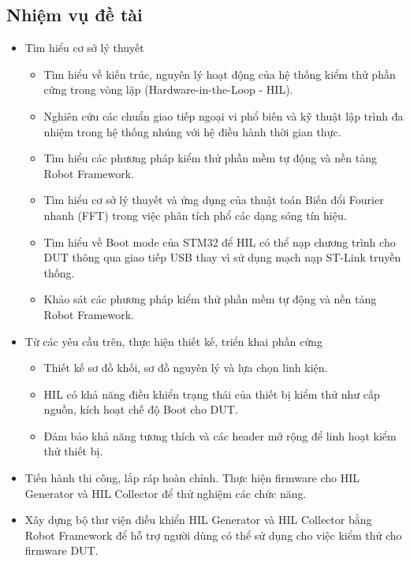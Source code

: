 \subsection{Nhiệm vụ đề tài}
\begin{itemize}
    \item Tìm hiểu cơ sở lý thuyết
    \begin{itemize}
        \item[-] Tìm hiểu về kiến trúc, nguyên lý hoạt động của hệ thống kiểm thử phần cứng trong vòng lặp (Hardware-in-the-Loop - HIL).
        \item[-] Nghiên cứu các chuẩn giao tiếp ngoại vi phổ biến và kỹ thuật lập trình đa nhiệm trong hệ thống nhúng với hệ điều hành thời gian thực.
        \item[-] Tìm hiểu các phương pháp kiểm thử phần mềm tự động và nền tảng Robot Framework.
        \item[-] Tìm hiểu cơ sở lý thuyết và ứng dụng của thuật toán Biến đổi Fourier nhanh (FFT) trong việc phân tích phổ các dạng sóng tín hiệu.
        \item[-] Tìm hiểu về Boot mode của STM32 để HIL có thể nạp chương trình cho DUT thông qua giao tiếp USB thay vì sử dụng mạch nạp ST-Link truyền thống.
        \item[-] Khảo sát các phương pháp kiểm thử phần mềm tự động và nền tảng Robot Framework.
    \end{itemize}

    \item Từ các yêu cầu trên, thực hiện thiết kế, triển khai phần cứng
    \begin{itemize}
        \item[-] Thiết kế sơ đồ khối, sơ đồ nguyên lý và lựa chọn linh kiện.
        \item[-] HIL có khả năng điều khiển trạng thái của thiết bị kiểm thử như cấp nguồn, kích hoạt chế độ Boot cho DUT.
        \item[-] Đảm bảo khả năng tương thích và các header mở rộng để linh hoạt kiểm thử thiết bị.
    \end{itemize}

    \item Tiến hành thi công, lắp ráp hoàn chỉnh. Thực hiện firmware cho HIL Generator và HIL Collector để thử nghiệm các chức năng.

    \item Xây dựng bộ thư viện điều khiển HIL Generator và HIL Collector bằng Robot Framework để hỗ trợ người dùng có thể sử dụng cho việc kiểm thử cho firmware DUT.


\end{itemize}

